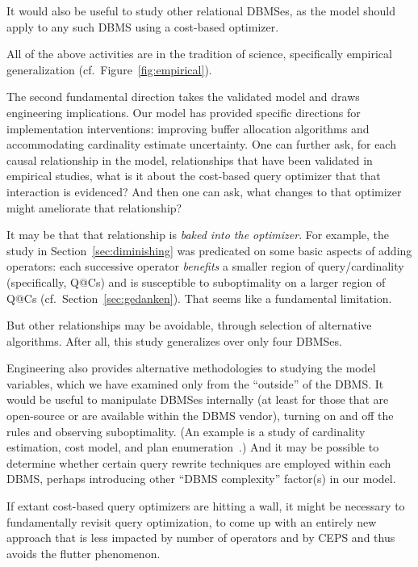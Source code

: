 \documentclass[prodmode,acmtods]{acmsmall}
\begin{document}
It would also be useful to study other relational DBMSes, as the model
should apply to any such DBMS using a cost-based optimizer.

All of the above activities are in the tradition of science, specifically
empirical generalization (cf.~Figure~\ref{fig:empirical}).

The second fundamental direction takes the validated model and draws
engineering implications. Our model has provided specific directions for implementation interventions:
improving buffer
allocation algorithms\discont{,}{} and accommodating cardinality estimate uncertainty.
One can further ask, for each causal relationship in the model,
relationships that have been validated in empirical studies, what is it about
the cost-based query optimizer that that interaction is evidenced? And then
one can ask, what changes to that optimizer might ameliorate that
relationship?

It may be that that relationship is {\em baked into the optimizer}. For
example, the study in Section~\ref{sec:diminishing} was predicated on some
basic aspects of adding operators: each successive operator {\em benefits} a smaller region
of query/cardinality (specifically, Q@Cs) and is susceptible to
suboptimality on a larger region of Q@Cs
(cf.~Section~\ref{sec:gedanken}). That seems like a fundamental limitation.

But other relationships may be avoidable, through selection of alternative
algorithms. After all, this study generalizes over only four DBMSes.

Engineering also provides alternative methodologies to studying the model
variables, which we have examined only from the ``outside'' of the DBMS. It
would be useful to manipulate \hbox{DBMSes} internally (at least for those
that are open-source or are available within the DBMS vendor), turning on
and off the rules and observing suboptimality. (An example is a
study of cardinality estimation, cost model, and plan enumeration~\cite{Leis15}.) And it may be possible to
determine whether \hbox{certain} query rewrite techniques are employed within each
\hbox{DBMS}, perhaps introducing other ``\hbox{DBMS} complexity'' factor(s) in our
model.

If extant cost-based query optimizers are hitting a wall,
it might be necessary to fundamentally revisit query optimization,
to come up with an entirely new approach that is less impacted by number
of operators and by CEPS and thus avoids the flutter phenomenon.
\end{document}
